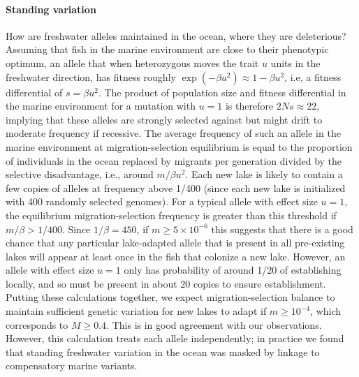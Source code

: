 \documentclass{article}
\begin{document}
\paragraph{Standing variation}
How are freshwater alleles maintained in the ocean, where they are deleterious?
Assuming that fish in the marine environment are close to their phenotypic optimum,
an allele that when heterozygous moves the trait $u$ units in the freshwater direction,
has fitness roughly $\exp(-\beta u^2) \approx 1 - \beta u^2$,
i.e, a fitness differential of $s = \beta u^2$. 
The product of population size and fitness differential in the marine environment for a mutation with $u=1$ is therefore $2Ns \approx 22$, 
implying that these alleles are strongly selected against but might drift to moderate frequency if recessive. 
The average frequency of such an allele in the marine environment at migration-selection equilibrium 
is equal to the proportion of individuals in the ocean replaced by migrants per generation divided by the selective disadvantage, 
i.e., around $m / \beta u^2$. 
Each new lake is likely to contain a few copies of alleles at frequency above 1/400 (since each new lake is initialized with 400 randomly selected genomes). 
For a typical allele with effect size $u=1$, 
the equilibrium migration-selection frequency is greater than this threshold if $m/\beta > 1/400$.
Since $1/\beta = 450$, if $m \ge 5 \times 10^{-6}$ this suggests that there is a good chance that 
any particular lake-adapted allele that is present in all pre-existing lakes 
will appear at least once in the fish that colonize a new lake. 
However, an allele with effect size $u=1$ only has probability of around 1/20 of establishing locally, 
and so must be present in about 20 copies to ensure establishment.
Putting these calculations together, 
we expect migration-selection balance to maintain sufficient genetic variation for new lakes to adapt if $m \ge 10^{-4}$, which corresponds to $M \ge 0.4$.
This is in good agreement with our observations.
However, this calculation treats each allele independently; in practice we found that standing freshwater variation in the ocean was masked by linkage to compensatory marine variants.
\end{document}
